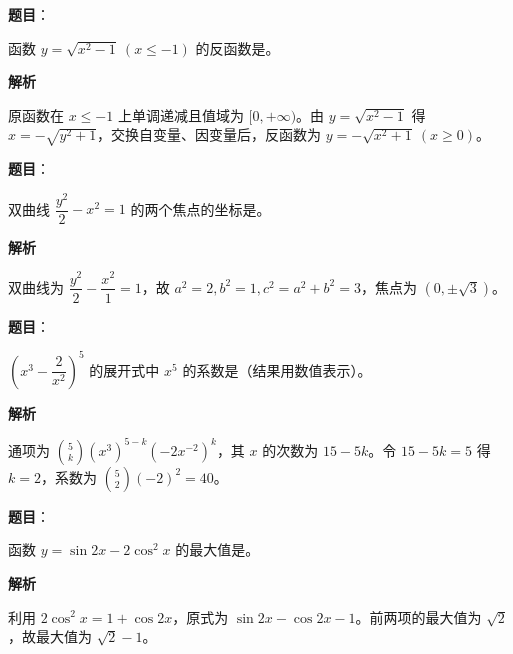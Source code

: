 \begin{answer}

\textbf{题目}：

函数 $y=\sqrt{x^2-1}\ (x\le -1)$ 的反函数是\gkblank{}。

\textbf{解析}

原函数在 $x\le-1$ 上单调递减且值域为 $[0,+\infty)$。由 $y=\sqrt{x^2-1}$ 得 $x=-\sqrt{y^2+1}$，交换自变量、因变量后，反函数为 $y=-\sqrt{x^2+1}\ (x\ge0)$。


\end{answer}
\begin{answer}

\textbf{题目}：

双曲线 $\dfrac{y^2}{2}-x^2=1$ 的两个焦点的坐标是\gkblank{}。

\textbf{解析}

双曲线为 $\dfrac{y^2}{2}-\dfrac{x^2}{1}=1$，故 $a^2=2,b^2=1,c^2=a^2+b^2=3$，焦点为 $(0,\pm\sqrt3)$。


\end{answer}
\begin{answer}

\textbf{题目}：

$\left(x^3-\dfrac2{x^2}\right)^5$ 的展开式中 $x^5$ 的系数是\gkblank{}（结果用数值表示）。

\textbf{解析}

通项为 $\binom5k(x^3)^{5-k}(-2x^{-2})^k$，其 $x$ 的次数为 $15-5k$。令 $15-5k=5$ 得 $k=2$，系数为 $\binom52(-2)^2=40$。


\end{answer}
\begin{answer}

\textbf{题目}：

函数 $y=\sin 2x-2\cos^2x$ 的最大值是\gkblank{}。

\textbf{解析}

利用 $2\cos^2x=1+\cos2x$，原式为 $\sin2x-\cos2x-1$。前两项的最大值为 $\sqrt2$，故最大值为 $\sqrt2-1$。


\end{answer}
